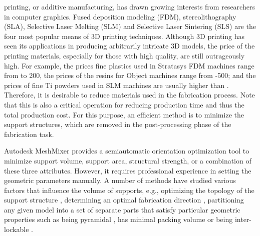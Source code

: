 


 printing, or additive manufacturing, has drawn growing interests from researchers in computer graphics. Fused deposition modeling (FDM), stereolithography (SLA), Selective Laser Melting (SLM) and Selective Laser Sintering (SLS) are the four most popular means of 3D printing techniques. Although 3D printing has seen its applications in producing arbitrarily intricate 3D models, the price of the printing materials, especially for those with high quality, are still outrageously high. {\color{red} For example, the prices fine plastics used in Stratasys FDM machines range from  to 200, the prices of the resins for Object machines range from -500; and the prices of fine Ti powders used in SLM machines are usually higher than .} Therefore, it is desirable to reduce materials used in the fabrication process. Note that this is also a critical operation for reducing production time and thus the total production cost. For this purpose, an efficient method is to minimize the support structures, which are removed in the post-processing phase of the fabrication task.

Autodesk MeshMixer provides a semiautomatic orientation optimization tool to minimize support volume, support area, structural strength, or a combination of these three attributes. However, it requires professional experience in setting the geometric parameters manually. A number of methods have studied various factors that influence the volume of supports, e.g., optimizing the topology of the support structure \cite{DumasHL14,VanekGB14}, determining an optimal fabrication direction \cite{Zhang:2015,HildebrandBA13,padhye2011multi}, partitioning any given model into a set of separate parts that satisfy particular geometric properties such as being pyramidal \cite{Hu_siga14}, has minimal packing volume \cite{VanekGBMCSM14} or being inter-lockable \cite{SongFLF15}.




